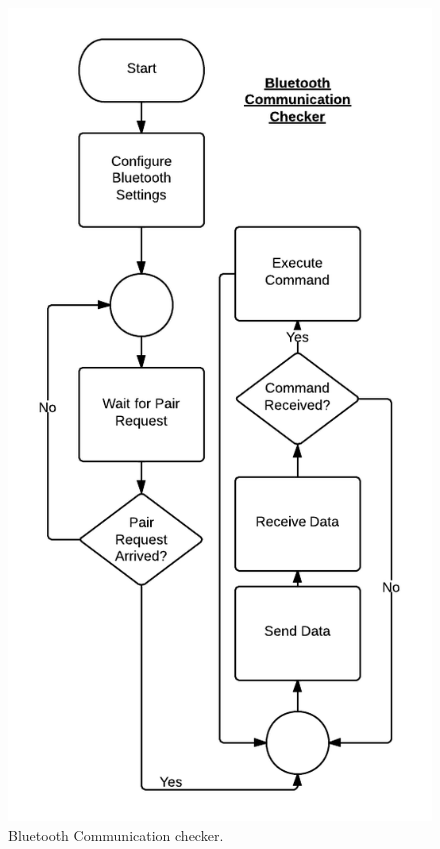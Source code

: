 	\begin{figure}[H]
		\centering
			\includegraphics[scale=0.5]{img/flowchart3}
		\caption{Bluetooth Communication checker.}
	\end{figure}

